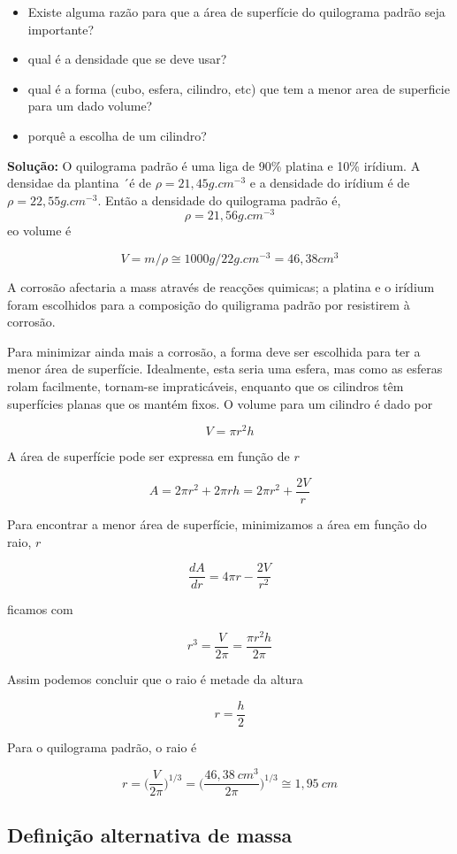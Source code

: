 \documentclass[
  portuguese,
  ]{book}
\begin{document}
\begin{itemize}
\item
  Existe alguma razão para que a área de superfície do quilograma padrão seja importante?
\item
  qual é a densidade que se deve usar?
\item
  qual é a forma (cubo, esfera, cilindro, etc) que tem a menor area de superficie para um dado volume?
\item
  porquê a escolha de um cilindro?
\end{itemize}

\textbf{Solução:} O quilograma padrão é uma liga de 90\% platina e 10\% irídium. A densidae da plantina ´é de \(\rho = 21,45 g.cm^{-3}\) e a densidade do irídium é de \(\rho = 22,55 g.cm^{-3}\). Então a densidade do quilograma padrão é, \[\rho = 21,56g.cm^{-3}\] eo volume é

\[V=m/\rho\cong1000g/22g.cm^{-3}=46,38cm^{3} \]

A corrosão afectaria a mass através de reacções quimicas; a platina e o irídium foram escolhidos para a composição do quiligrama padrão por resistirem à corrosão.

Para minimizar ainda mais a corrosão, a forma deve ser escolhida para ter a menor área de superfície. Idealmente, esta seria uma esfera, mas como as esferas rolam facilmente, tornam-se impraticáveis, enquanto que os cilindros têm superfícies planas que os mantém fixos. O volume para um cilindro é dado por

\[V=\pi r^2h\]

A área de superfície pode ser expressa em função de \(r\)

\[A=2\pi r^2+2\pi rh=2\pi r^2+\frac{2V}{r}\]

Para encontrar a menor área de superfície, minimizamos a área em função do raio, \(r\)

\[\frac{dA}{dr}=4\pi r - \frac{2V}{r^2}\]

ficamos com

\[r^3=\frac{V}{2\pi}=\frac{\pi r^2 h}{2 \pi}\]

Assim podemos concluir que o raio é metade da altura

\[r=\frac{h}{2}\]

Para o quilograma padrão, o raio é

\[r=\Big(\frac{V}{2\pi}\Big)^{1/3}=\Big(\frac{46,38\ cm^3}{2\pi}\Big)^{1/3}\cong1,95\ cm\]

\hypertarget{definiuxe7uxe3o-alternativa-de-massa}{%
\subsection{Definição alternativa de massa}\label{definiuxe7uxe3o-alternativa-de-massa}}
\end{document}
